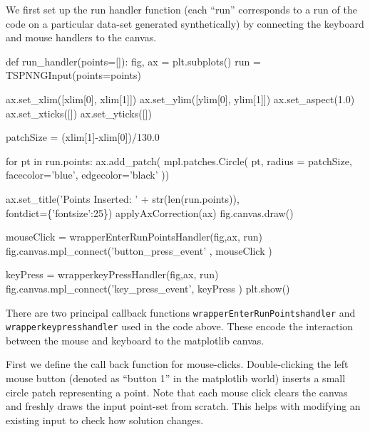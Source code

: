 We first set up the run handler function (each ``run'' corresponds to a run of the code on a particular data-set generated synthetically)
by connecting the keyboard and mouse handlers to the canvas. 

\nwenddocs{}\endmoddef\nwstartdeflinemarkup{}\nwenddeflinemarkup
def run_handler(points=[]):
    fig, ax =  plt.subplots()
    run = TSPNNGInput(points=points)
    
    ax.set_xlim([xlim[0], xlim[1]])
    ax.set_ylim([ylim[0], ylim[1]])
    ax.set_aspect(1.0)
    ax.set_xticks([])
    ax.set_yticks([])
 
    patchSize  = (xlim[1]-xlim[0])/130.0

    for pt in run.points:
       ax.add_patch( mpl.patches.Circle( pt, radius = patchSize,
                           facecolor='blue', edgecolor='black'  ))

    ax.set_title('Points Inserted: ' + str(len(run.points)), \\
                   fontdict=\{'fontsize':25\})
    applyAxCorrection(ax)
    fig.canvas.draw()

    mouseClick   = wrapperEnterRunPointsHandler(fig,ax, run)
    fig.canvas.mpl_connect('button_press_event' , mouseClick )
      
    keyPress     = wrapperkeyPressHandler(fig,ax, run)
    fig.canvas.mpl_connect('key_press_event', keyPress   )
    plt.show()
\nwendcode{}\nwdocspar



There are two principal callback functions \verb|wrapperEnterRunPointshandler| and \verb|wrapperkeypresshandler| used in the code above. 
These encode the interaction between the mouse and keyboard to the matplotlib canvas. 

First we define the call back function for mouse-clicks. Double-clicking the left mouse button (denoted as ``button 1'' in the matplotlib world)
inserts a small circle patch representing a point. Note that each mouse click 
clears the canvas
and freshly draws the input point-set from scratch. 
This helps with modifying an existing input to check how solution changes. 

